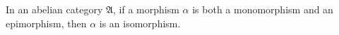In an abelian category $\mathfrak{A}$, if a morphism $\alpha$ is both a monomorphism and an epimorphism, then $\alpha$ is an isomorphism.
